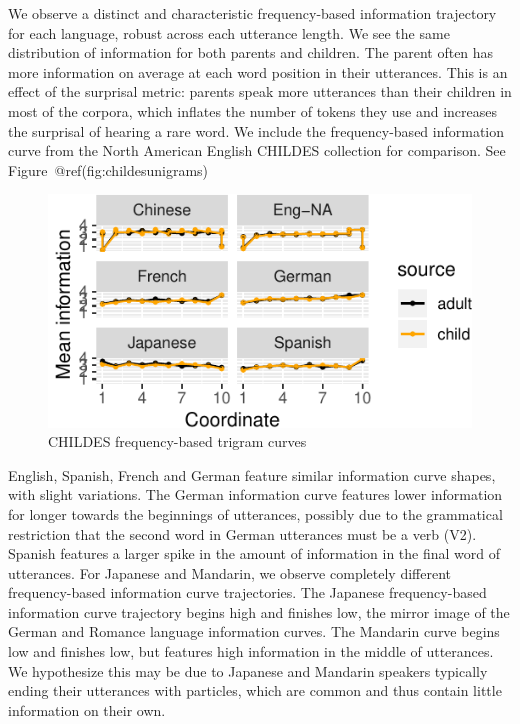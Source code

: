 \documentclass[10pt, letterpaper]{article}
\newenvironment{CodeChunk}{}{}
\begin{document}
We observe a distinct and characteristic frequency-based information
trajectory for each language, robust across each utterance length. We
see the same distribution of information for both parents and children.
The parent often has more information on average at each word position
in their utterances. This is an effect of the surprisal metric: parents
speak more utterances than their children in most of the corpora, which
inflates the number of tokens they use and increases the surprisal of
hearing a rare word. We include the frequency-based information curve
from the North American English CHILDES collection for comparison. See
Figure~@ref(fig:childesunigrams)

\begin{CodeChunk}
\begin{figure}[tb]
\includegraphics{figs/childesunigrams-1} \caption[CHILDES frequency-based trigram curves]{CHILDES frequency-based trigram curves}\label{fig:childesunigrams}
\end{figure}
\end{CodeChunk}

English, Spanish, French and German feature similar information curve
shapes, with slight variations. The German information curve features
lower information for longer towards the beginnings of utterances,
possibly due to the grammatical restriction that the second word in
German utterances must be a verb (V2). Spanish features a larger spike
in the amount of information in the final word of utterances. For
Japanese and Mandarin, we observe completely different frequency-based
information curve trajectories. The Japanese frequency-based information
curve trajectory begins high and finishes low, the mirror image of the
German and Romance language information curves. The Mandarin curve
begins low and finishes low, but features high information in the middle
of utterances. We hypothesize this may be due to Japanese and Mandarin
speakers typically ending their utterances with particles, which are
common and thus contain little information on their own.
\end{document}
